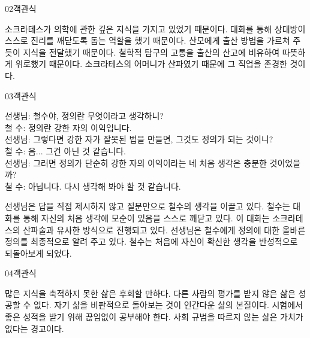 \documentclass[fs85,seriesWit]{korfarm-base}
\begin{document}
\begin{kfQBlock}{02}{객관식}
\begin{kfChoices}
\kfChoice 소크라테스가 의학에 관한 깊은 지식을 가지고 있었기 때문이다.
\kfChoice 대화를 통해 상대방이 스스로 진리를 깨닫도록 돕는 역할을 했기 때문이다.
\kfChoice 산모에게 출산 방법을 가르쳐 주듯이 지식을 전달했기 때문이다.
\kfChoice 철학적 탐구의 고통을 출산의 산고에 비유하여 따뜻하게 위로했기 때문이다.
\kfChoice 소크라테스의 어머니가 산파였기 때문에 그 직업을 존경한 것이다.
\end{kfChoices}
\end{kfQBlock}

\begin{kfQBlock}{03}{객관식}
\begin{kfEvidence}선생님: 철수야, 정의란 무엇이라고 생각하니? \\\relax
철  수: 정의란 강한 자의 이익입니다. \\\relax
선생님: 그렇다면 강한 자가 잘못된 법을 만들면, 그것도 정의가 되는 것이니? \\\relax
철  수: 음... 그건 아닌 것 같습니다. \\\relax
선생님: 그러면 정의가 단순히 강한 자의 이익이라는 네 처음 생각은 충분한 것이었을까? \\\relax
철  수: 아닙니다. 다시 생각해 봐야 할 것 같습니다.\end{kfEvidence}
\begin{kfChoices}
\kfChoice 선생님은 답을 직접 제시하지 않고 질문만으로 철수의 생각을 이끌고 있다.
\kfChoice 철수는 대화를 통해 자신의 처음 생각에 모순이 있음을 스스로 깨닫고 있다.
\kfChoice 이 대화는 소크라테스의 산파술과 유사한 방식으로 진행되고 있다.
\kfChoice 선생님은 철수에게 정의에 대한 올바른 정의를 최종적으로 알려 주고 있다.
\kfChoice 철수는 처음에 자신이 확신한 생각을 반성적으로 되돌아보게 되었다.
\end{kfChoices}
\end{kfQBlock}

\begin{kfQBlock}{04}{객관식}
\begin{kfChoices}
\kfChoice 많은 지식을 축적하지 못한 삶은 후회할 만하다.
\kfChoice 다른 사람의 평가를 받지 않은 삶은 성공할 수 없다.
\kfChoice 자기 삶을 비판적으로 돌아보는 것이 인간다운 삶의 본질이다.
\kfChoice 시험에서 좋은 성적을 받기 위해 끊임없이 공부해야 한다.
\kfChoice 사회 규범을 따르지 않는 삶은 가치가 없다는 경고이다.
\end{kfChoices}
\end{kfQBlock}
\end{document}
